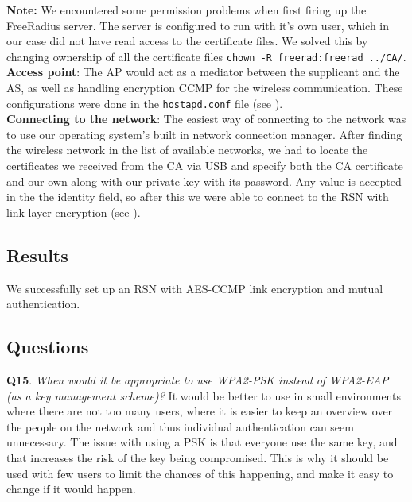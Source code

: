 \documentclass[a4paper,11pt]{article}
\begin{document}
\noindent \textbf{Note:} We encountered some permission problems when first firing up the FreeRadius server. The server is configured to run with it's own user, which in our case did not have read access to the certificate files. We solved this by changing ownership of all the certificate files   \texttt{chown -R freerad:freerad ../CA/}. \\

\noindent\textbf{Access point}: The AP would act as a mediator between the supplicant and the AS, as well as handling encryption CCMP for the wireless communication. These configurations were done in the \texttt{hostapd.conf} file (see ). \\

\noindent\textbf{Connecting to the network}: The easiest way of connecting to the network was to use our operating system's built in network connection manager. After finding the wireless network in the list of available networks, we had to locate the certificates we received from the CA via USB and specify both the CA certificate and our own along with our private key with its password. Any value is accepted in the the identity field, so after this we were able to connect to the RSN with link layer encryption (see ).

\subsection{Results} %

We successfully set up an RSN with AES-CCMP link encryption and mutual authentication.

\label{sub:results}


\subsection{Questions}

\textbf{Q15}. \textit{When would it be appropriate to use WPA2-PSK instead of WPA2-EAP (as a key management scheme)?} It would be better to use in small environments where there are not too many users, where it is easier to keep an overview over the people on the network and thus individual authentication can seem unnecessary. The issue with using a PSK is that everyone use the same key, and that increases the risk of the key being compromised. This is why it should be used with few users to limit the chances of this happening, and make it easy to change if it would happen. \\
\end{document}
